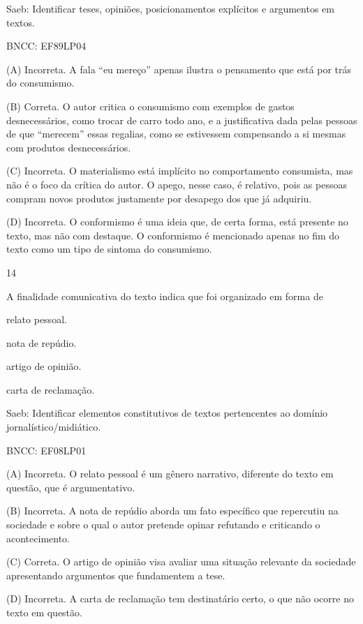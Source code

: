 Saeb: Identificar teses, opiniões, posicionamentos explícitos e
argumentos em textos.

BNCC: EF89LP04

(A) Incorreta. A fala ``eu mereço'' apenas ilustra o pensamento que está
por trás do consumismo.

(B) Correta. O autor critica o consumismo com exemplos de gastos
desnecessários, como trocar de carro todo ano, e a justificativa dada
pelas pessoas de que ``merecem'' essas regalias, como se estivessem
compensando a si mesmas com produtos desnecessários.

(C) Incorreta. O materialismo está implícito no comportamento
consumista, mas não é o foco da crítica do autor. O apego, nesse caso, é
relativo, pois as pessoas compram novos produtos justamente por desapego
dos que já adquiriu.

(D) Incorreta. O conformismo é uma ideia que, de certa forma, está
presente no texto, mas não com destaque. O conformismo é mencionado
apenas no fim do texto como um tipo de sintoma do consumismo.

\num{14}

A finalidade comunicativa do texto indica que foi organizado em forma de

\begin{escolha}
\item relato pessoal.

\item nota de repúdio.

\item artigo de opinião.

\item carta de reclamação.
\end{escolha}

Saeb: Identificar elementos constitutivos de textos pertencentes ao
domínio jornalístico/midiático.

BNCC: EF08LP01

(A) Incorreta. O relato pessoal é um gênero narrativo, diferente do
texto em questão, que é argumentativo.

(B) Incorreta. A nota de repúdio aborda um fato específico que
repercutiu na sociedade e sobre o qual o autor pretende opinar refutando
e criticando o acontecimento.

(C) Correta. O artigo de opinião visa avaliar uma situação relevante da
sociedade apresentando argumentos que fundamentem a tese.

(D) Incorreta. A carta de reclamação tem destinatário certo, o que não
ocorre no texto em questão.

